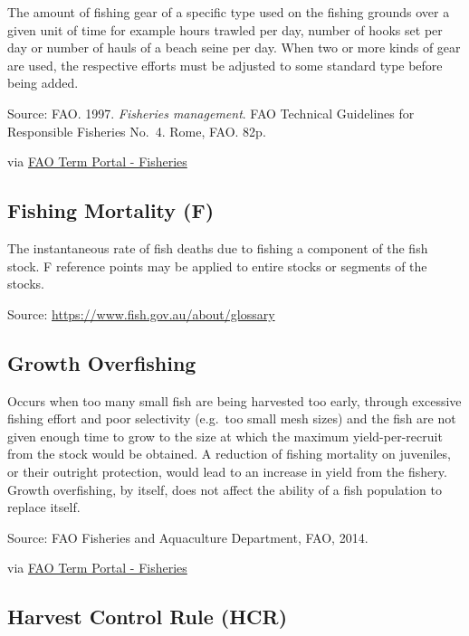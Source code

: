 \documentclass[
  11pt,
]{book}
\begin{document}
The amount of fishing gear of a specific type used on the fishing grounds over a given unit of time for example hours trawled per day, number of hooks set per day or number of hauls of a beach seine per day. When two or more kinds of gear are used, the respective efforts must be adjusted to some standard type before being added.

Source: FAO. 1997. \emph{Fisheries management}. FAO Technical Guidelines for Responsible Fisheries No.~4. Rome, FAO. 82p.

via \href{http://www.fao.org/fishery/glossary/en}{FAO Term Portal - Fisheries}

\hypertarget{fishing-mortality-f}{%
\subsection{Fishing Mortality (F)}\label{fishing-mortality-f}}

The instantaneous rate of fish deaths due to fishing a component of the fish stock. F reference points may be applied to entire stocks or segments of the stocks.

Source: \url{https://www.fish.gov.au/about/glossary}

\hypertarget{growth-overfishing}{%
\subsection{Growth Overfishing}\label{growth-overfishing}}

Occurs when too many small fish are being harvested too early, through excessive fishing effort and poor selectivity (e.g.~too small mesh sizes) and the fish are not given enough time to grow to the size at which the maximum yield-per-recruit from the stock would be obtained. A reduction of fishing mortality on juveniles, or their outright protection, would lead to an increase in yield from the fishery. Growth overfishing, by itself, does not affect the ability of a fish population to replace itself.

Source: FAO Fisheries and Aquaculture Department, FAO, 2014.

via \href{http://www.fao.org/fishery/glossary/en}{FAO Term Portal - Fisheries}

\hypertarget{harvest-control-rule-hcr}{%
\subsection{Harvest Control Rule (HCR)}\label{harvest-control-rule-hcr}}
\end{document}

